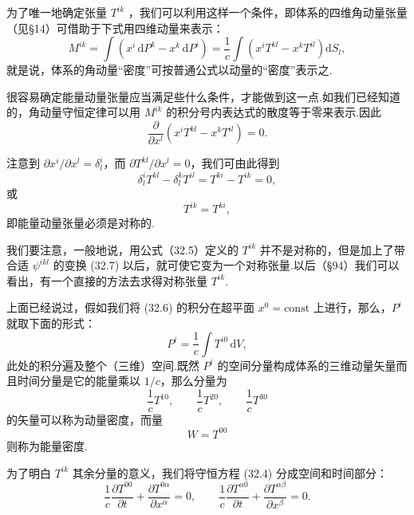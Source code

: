 为了唯一地确定张量 $T^{ik}$
，我们可以利用这样一个条件，即体系的四维角动量张量（见§14）可借助于下式用四维动量来表示：
\begin{equation}
  M^{ik}=\int\left(x^i\,\mathrm{d}P^k-x^k\,\mathrm{d}P^i\right)
  =\frac{1}{c}\int\left(x^iT^{kl}-x^kT^{il}\right)\mathrm{d}S_l,
\end{equation}
就是说，体系的角动量“密度”可按普通公式以动量的“密度”表示之.

很容易确定能量动量张量应当满足些什么条件，才能做到这一点.如我们已经知道的，角动量守恒定律可以用 $M^{ik}$
的积分号内表达式的散度等于零来表示.因此
\begin{equation}
  \frac{\partial}{\partial x^l}
  \left(x^iT^{kl}-x^kT^{il}\right)=0.
\end{equation}

注意到 $\partial x^i/\partial x^l=\delta_l^i$，而 $\partial T^{kl}/\partial x^l=0$，我们可由此得到
\begin{equation*}
  \delta_l^iT^{kl}-\delta_l^kT^{il}=T^{ki}-T^{ik}=0,
\end{equation*}
或
\begin{equation}
  T^{ik}=T^{ki},
\end{equation}
即能量动量张量必须是对称的.

我们要注意，一般地说，用公式（32.5）定义的 $T^{ik}$
并不是对称的，但是加上了带合适 $\psi^{ikl}$ 的变换 (32.7)
以后，就可使它变为一个对称张量.以后（§94）我们可以看出，有一个直接的方法去求得对称张量 $T^{ik}$.

上面已经说过，假如我们将 (32.6) 的积分在超平面 $x^0=\mathrm{const}$ 上进行，那么，$P^i$
就取下面的形式：
\begin{equation}
  P^i=\frac{1}{c}\int T^{i0}\,\mathrm{d}V,
\end{equation}
此处的积分遍及整个（三维）空间.既然 $P^i$
的空间分量构成体系的三维动量矢量而且时间分量是它的能量乘以 $1/c$，那么分量为
\begin{equation*}
  \frac{1}{c}T^{10},\qquad
  \frac{1}{c}T^{20},\qquad
  \frac{1}{c}T^{30}
\end{equation*}
的矢量可以称为动量密度，而量
\begin{equation*}
  W=T^{00}
\end{equation*}
则称为能量密度.

为了明白 $T^{ik}$ 其余分量的意义，我们将守恒方程 (32.4) 分成空间和时间部分：
\begin{equation}
  \frac{1}{c}\frac{\partial T^{00}}{\partial t}
  +\frac{\partial T^{0\alpha}}{\partial x^\alpha}=0,\qquad
  \frac{1}{c}\frac{\partial T^{\alpha 0}}{\partial t}
  +\frac{\partial T^{\alpha\beta}}{\partial x^\beta}=0.
\end{equation}

